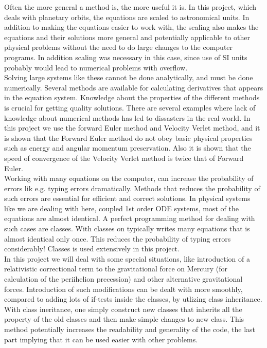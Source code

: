 \documentclass{article}
\begin{document}
Often the more general a method is, the more useful it is. In this project, which deals with planetary orbits, the equations are scaled to astronomical units. In addition to making the equations easier to work with, the scaling also makes the equations and their solutions more general and potentially applicable to other physical problems without the need to do large changes to the computer programs. In addition scaling was necessary in this case, since use of SI units probably would lead to numerical problems with overflow.\\

Solving large systems like these cannot be done analytically, and must be done numerically. Several methods are available for calculating derivatives that appears in the equation system. Knowledge about the properties of the different methods is crucial for getting quality solutions. There are several examples where lack of knowledge about numerical methods has led to dissasters in the real world. In this project we use the forward Euler method and Velocity Verlet method, and it is shown that the Forward Euler method do not obey basic physical properties such as energy and angular momentum preservation. Also it is shown that the speed of convergence of the Velocity Verlet method is twice that of Forward Euler.\\

Working with many equations on the computer, can increase the probability of errors lik e.g. typing errors dramatically. Methods that reduces the probability of such errors are essential for efficient and correct solutions. In physical systems like we are dealing with here, coupled 1st order ODE systems, most of the equations are almost identical. A perfect programming method for dealing with such cases are classes. With classes on typically writes many equations that is almost identical only once. This reduces the probability of typing errors considerably! Classes is used extensively in this project.\\

In this project we will deal with some special situations, like introduction of a relativistic correctional term to the gravitational force on Mercury (for calculation of the periihelion precession) and other alternative gravitational forces. Introduction of such modifications can be dealt with more smoothly, compared to adding lots of if-tests inside the classes, by utlizing class inheritance. With class ineritance, one simply construct new classes that inherits all the property of the old classes and then make simple changes to new class. This method potentially increases the readability and generality of the code, the last part implying that it can be used easier with other problems.\\
\end{document}
